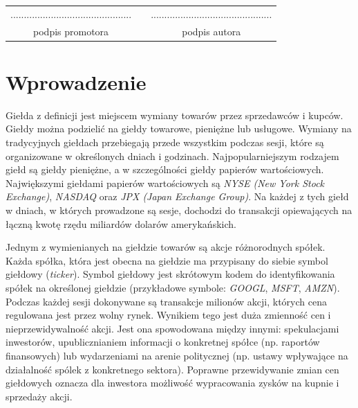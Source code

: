 \documentclass[a4paper, twoside, 11pt, openright]{article}
\newcommand{\fncymain}{%
	\fancyhead[RO]{{\footnotesize \rightmark}}
	\fancyfoot[RO]{\thepage}
	\fancyhead[LE]{{\footnotesize \leftmark}}
	\fancyfoot[LE]{\thepage}
	\fancyfoot[C]{}
	\renewcommand{\headrulewidth}{0.3pt}}
\begin{document}
\cleardoublepage


\hfill
\begin{table}[b]
\centering
\begin{tabular}[t]{ccc}
............................................. & \hspace*{100pt} & .............................................\\
podpis promotora & \hspace*{100pt} & podpis autora
\end{tabular}
\end{table}

\fncymain



\cleardoublepage

\tableofcontents

\cleardoublepage

\section{Wprowadzenie}

Giełda z definicji jest miejscem wymiany towarów przez sprzedawców i kupców. Giełdy można podzielić na giełdy towarowe, pieniężne lub usługowe. Wymiany na tradycyjnych giełdach przebiegają przede wszystkim podczas sesji, które są organizowane w określonych dniach i godzinach. Najpopularniejszym rodzajem giełd są giełdy pieniężne, a w szczególności giełdy papierów wartościowych. Największymi giełdami papierów wartościowych są \textit{NYSE (New York Stock Exchange)}\cite{nyse}, \textit{NASDAQ}\cite{nasdaq} oraz \textit{JPX (Japan Exchange Group)}\cite{jpx}. Na każdej z tych giełd w dniach, w których prowadzone są sesje, dochodzi do transakcji opiewających na łączną kwotę rzędu miliardów dolarów amerykańskich.

\bigskip

 Jednym z wymienianych na giełdzie towarów są akcje różnorodnych spółek. Każda spółka, która jest obecna na giełdzie ma przypisany do siebie symbol giełdowy (\textit{ticker}). Symbol giełdowy jest skrótowym kodem do identyfikowania spółek na określonej giełdzie (przykładowe symbole: \textit{GOOGL}, \textit{MSFT}, \textit{AMZN}). Podczas każdej sesji dokonywane są transakcje milionów akcji, których cena regulowana jest przez wolny rynek. Wynikiem tego jest duża zmienność cen i nieprzewidywalność akcji. Jest ona spowodowana między innymi: spekulacjami inwestorów, upublicznianiem informacji o konkretnej spółce (np. raportów finansowych) lub wydarzeniami na arenie politycznej (np. ustawy wpływające na działalność spólek z konkretnego sektora). Poprawne przewidywanie zmian cen giełdowych oznacza dla inwestora możliwość wypracowania zysków na kupnie i sprzedaży akcji.
 
\end{document}
